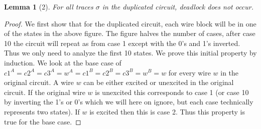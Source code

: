 \documentclass{article}
\newtheorem*{lemma}{Lemma}
\begin{document}
\begin{lemma}[2]
For all traces $\sigma$ in the duplicated circuit, deadlock does not occur.
\end{lemma}
\begin{proof}
We first show that for the duplicated circuit, each wire block will be in one of the states in the above figure.  The figure halves the number of cases, after case 10 the circuit will repeat as from case 1 except with the 0's and 1's inverted.  Thus we only need to analyze the first 10 states.  \newline
We prove this initial property by induction.  We look at the base case of $c1^A=c2^A=c3^A=w^A=c1^B=c2^B=c3^B=w^B=w$ for every wire $w$ in the original circuit.  A wire $w$ can be either excited or unexcited in the original circuit. If the original wire $w$ is unexcited this corresponds to case 1 (or case 10 by inverting the 1's or 0's which we will here on ignore, but each case technically represents two states).  If $w$ is excited then this is case 2.  Thus this property is true for the base case. \newline


\end{proof}
\end{document}
